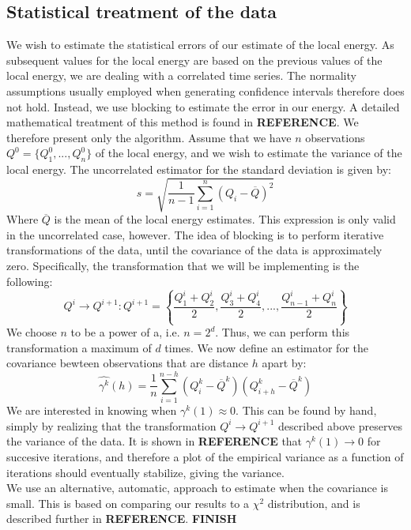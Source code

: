 \documentclass[a4paper, 10pt]{article}
\begin{document}
\subsection{Statistical treatment of the data}
We wish to estimate the statistical errors of our estimate of the local energy. As subsequent values for the local energy are based on the previous values of the local energy, we are dealing with a correlated time series. The normality assumptions usually employed when generating confidence intervals therefore does not hold. Instead, we use blocking to estimate the error in our energy. A detailed mathematical treatment of this method is found in \textbf{REFERENCE}. We therefore present only the algorithm. Assume that we have $n$ observations $Q^0=\{Q_1^0,...,Q_n^0\}$ of the local energy, and we wish to estimate the variance of the local energy. The uncorrelated estimator for the standard deviation is given by:
\begin{equation}
s=\sqrt{\frac{1}{n-1}\sum_{i=1}^n (Q_i-\overline{Q})^2}
\end{equation}
Where $\overline{Q}$ is the mean of the local energy estimates. This expression is only valid in the uncorrelated case, however. The idea of blocking is to perform iterative transformations of the data, until the covariance of the data is approximately zero. Specifically, the transformation that we will be implementing is the following:
\begin{equation}
Q^i \rightarrow Q^{i+1}: Q^{i+1} = \left\{ \frac{Q^i_1+Q^i_2}{2}, \frac{Q^i_3+Q^i_4}{2},...,\frac{Q^i_{n-1}+Q^i_{n}}{2}\right\}
\end{equation}
We choose $n$ to be a power of a, i.e. $n=2^d$. Thus, we can perform this transformation a maximum of $d$ times. We now define an estimator for the covariance bewteen observations that are distance $h$ apart by:
\begin{equation}
\hat{\gamma^k}(h)=\frac{1}{n}\sum_{i=1}^{n-h}(Q_i^k-\overline{Q}^k)(Q_{i+h}^k-\overline{Q}^k)
\end{equation}
We are interested in knowing when $\gamma^k(1)\approx 0$. This can be found by hand, simply by realizing that the transformation $Q^i \rightarrow Q^{i+1}$ described above preserves the variance of the data. It is shown in \textbf{REFERENCE} that $\gamma^k(1) \rightarrow 0$ for succesive iterations, and therefore a plot of the empirical variance as a function of iterations should eventually stabilize, giving the variance. \\
\linebreak
We use an alternative, automatic, approach to estimate when the covariance is small. This is based on comparing our results to a $\chi^2$ distribution, and is described further in \textbf{REFERENCE}.
\textbf{FINISH}
\end{document}
